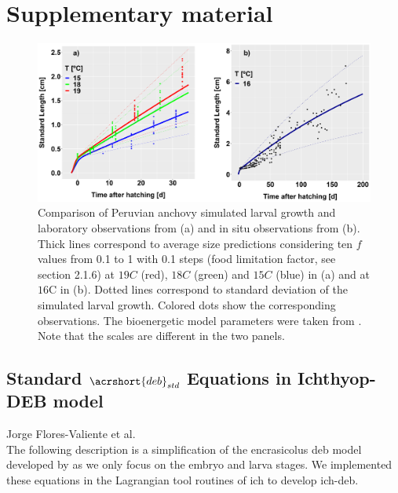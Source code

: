 \chapter{Supplementary material}\label{App1}

\begin{figure}[ht]
	\includegraphics[width=1.0\textwidth]{figures/S1DEBvsData.png}
	\centering
	\caption{Comparison of Peruvian anchovy simulated larval growth and laboratory observations from \cite{RiouOfel2021} (a) and in situ observations from \cite{MoreClar2011} (b). Thick lines correspond to average size predictions considering ten $f$ values from 0.1 to 1 with 0.1 steps (food limitation factor, see section 2.1.6) at $19$\textdegree $C$ (red), $18$\textdegree $C$ (green) and $15$\textdegree $C$ (blue) in (a) and at $16$\textdegree C in (b). Dotted lines correspond to standard deviation of the simulated larval growth. Colored dots show the corresponding observations. The bioenergetic model parameters were taken from \cite{PethRoos2013}. Note that the scales are different in the two panels.}
	\label{S1DEBvsData}
\end{figure}

\section{Standard $\acrshort{deb}_{std}$ Equations in Ichthyop-DEB model}\label{DEBstdEqn}

Jorge Flores-Valiente et al.\\

The following description is a simplification of the \gls{encrasicolus} \acrshort{deb} model developed by \cite{PethRoos2013} as we only focus on the embryo and larva stages. We implemented these equations in the Lagrangian tool routines of \gls{ich} \citep{LettVerl2008} to develop \gls{ich-deb}.\\

